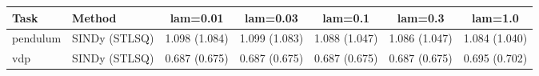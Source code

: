 \begin{tabular}{llccccc}\toprule
Task & Method & lam=0.01 & lam=0.03 & lam=0.1 & lam=0.3 & lam=1.0 \\\midrule
pendulum & SINDy (STLSQ) & 1.098 (1.084) & 1.099 (1.083) & 1.088 (1.047) & 1.086 (1.047) & 1.084 (1.040) \\
vdp & SINDy (STLSQ) & 0.687 (0.675) & 0.687 (0.675) & 0.687 (0.675) & 0.687 (0.675) & 0.695 (0.702) \\
\bottomrule\end{tabular}
